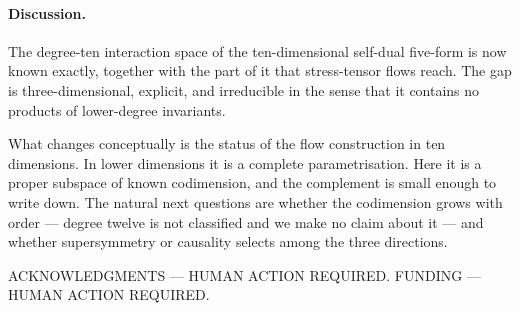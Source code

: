 \documentclass[aps,prl,reprint,superscriptaddress,nofootinbib,floatfix]{revtex4-2}
\begin{document}
\paragraph*{Discussion.}
The degree-ten interaction space of the ten-dimensional self-dual five-form is
now known exactly, together with the part of it that stress-tensor flows reach.
The gap is three-dimensional, explicit, and irreducible in the sense that it
contains no products of lower-degree invariants.

What changes conceptually is the status of the flow construction in ten
dimensions. In lower dimensions it is a complete parametrisation. Here it is a
proper subspace of known codimension, and the complement is small enough to write
down. The natural next questions are whether the codimension grows with order ---
degree twelve is not classified and we make no claim about it --- and whether
supersymmetry or causality selects among the three directions.

\begin{acknowledgments}
ACKNOWLEDGMENTS --- HUMAN ACTION REQUIRED.
FUNDING --- HUMAN ACTION REQUIRED.
\end{acknowledgments}




\clearpage

\end{document}
